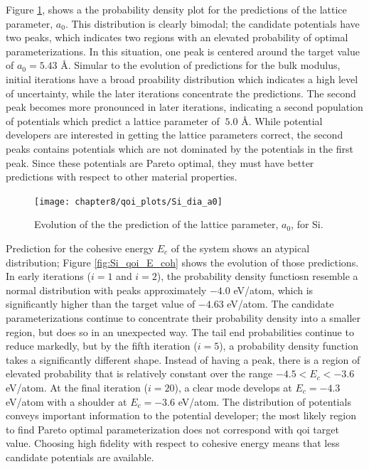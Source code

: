 Figure \ref{fig:Si_qoi_a0}, shows a the probability density plot for the predictions of the lattice parameter, $a_0$.  This distribution is clearly bimodal; the candidate potentials have two peaks, which indicates two regions with an elevated probability of optimal parameterizations.  In this situation, one peak is centered around the target value of $a_0=5.43$ \AA.  Simular to the evolution of predictions for the bulk modulus, initial iterations have a broad proability distribution which indicates a high level of uncertainty, while the later iterations concentrate the predictions. The second peak becomes more pronounced in later iterations, indicating a second population of potentials which predict a lattice parameter of $~5.0$ \AA.  While potential developers are interested in getting the lattice parameters correct, the second peaks contains potentials which are not dominated by the potentials in the first peak.  Since these potentials are Pareto optimal, they must have better predictions with respect to other material properties.

\begin{figure}[h]
	\centering
	\texttt{[image: chapter8/qoi\_plots/Si\_dia\_a0]}
	\caption{Evolution of the the prediction of the lattice parameter, $a_0$, for Si.}
	\label{fig:Si_qoi_a0}
\end{figure}

Prediction for the cohesive energy $E_c$ of the system shows an atypical distribution; Figure \ref{fig:Si_qoi_E_coh} shows the evolution of those predictions.  In early iterations ($i=1$ and $i=2$), the probability density functiosn resemble a normal distribution with peaks approximately $-4.0$ eV/atom, which is significantly higher than the target value of $-4.63$ eV/atom.  The candidate parameterizations continue to concentrate their probability density into a smaller region, but does so in an unexpected way.  The tail end probabilities continue to reduce markedly, but by the fifth iteration ($i=5$), a probability density function takes a significantly different shape.  Instead of having a peak, there is a region of elevated probability that is relatively constant over the range $-4.5 < E_c < -3.6 $ eV/atom.  At the final iteration ($i=20$), a clear mode develops at $E_c=-4.3$ eV/atom with a shoulder at $E_c=-3.6$ eV/atom.
The distribution of potentials conveys important information to the potential developer; the most likely region to find Pareto optimal parameterization does not correspond with qoi target value.  Choosing high fidelity with respect to cohesive energy means that less candidate potentials are available.

